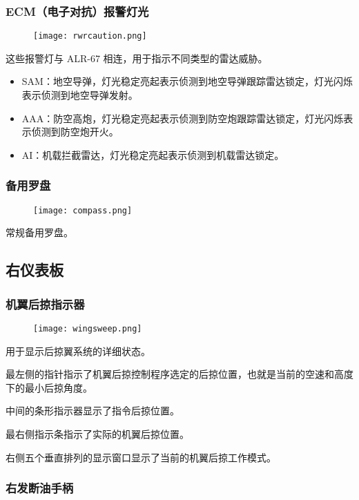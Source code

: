 \subsubsection{ECM（电子对抗）报警灯光}

\begin{figure}[htb]
  \center
  \texttt{[image: rwrcaution.png]}
\end{figure}
这些报警灯与 ALR-67 相连，用于指示不同类型的雷达威胁。

\begin{itemize}
  \item SAM：地空导弹，灯光稳定亮起表示侦测到地空导弹跟踪雷达锁定，灯光闪烁表示侦测到地空导弹发射。
  \item AAA：防空高炮，灯光稳定亮起表示侦测到防空炮跟踪雷达锁定，灯光闪烁表示侦测到防空炮开火。
  \item AI：机载拦截雷达，灯光稳定亮起表示侦测到机载雷达锁定。
\end{itemize}

\subsubsection{备用罗盘}

\begin{figure}[htb]
  \center
  \texttt{[image: compass.png]}
\end{figure}
常规备用罗盘。

\subsection{右仪表板}

\subsubsection{机翼后掠指示器}

\begin{figure}[htb]
  \center
  \texttt{[image: wingsweep.png]}
\end{figure}
用于显示后掠翼系统的详细状态。

最左侧的指针指示了机翼后掠控制程序选定的后掠位置，也就是当前的空速和高度下的最小后掠角度。

中间的条形指示器显示了指令后掠位置。

最右侧指示条指示了实际的机翼后掠位置。

右侧五个垂直排列的显示窗口显示了当前的机翼后掠工作模式。

\subsubsection{右发断油手柄}

